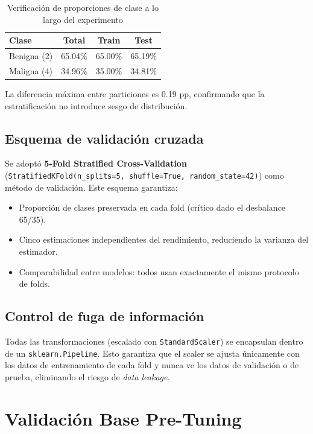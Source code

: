 \documentclass[11pt,a4paper]{article}
\begin{document}
\begin{table}[H]
\centering
\caption{Verificación de proporciones de clase a lo largo del experimento}
\begin{tabular}{lccc}
\toprule
\textbf{Clase} & \textbf{Total} & \textbf{Train} & \textbf{Test} \\
\midrule
Benigna (2) & 65.04\% & 65.00\% & 65.19\% \\
Maligna (4) & 34.96\% & 35.00\% & 34.81\% \\
\bottomrule
\end{tabular}
\end{table}

La diferencia máxima entre particiones es 0.19 pp, confirmando que la estratificación no introduce sesgo de distribución.

\subsection{Esquema de validación cruzada}

Se adoptó \textbf{5-Fold Stratified Cross-Validation} (\texttt{StratifiedKFold(n\_splits=5, shuffle=True, random\_state=42)}) como método de validación. Este esquema garantiza:

\begin{itemize}[leftmargin=1.4cm]
\item Proporción de clases preservada en cada fold (crítico dado el desbalance 65/35).
\item Cinco estimaciones independientes del rendimiento, reduciendo la varianza del estimador.
\item Comparabilidad entre modelos: todos usan exactamente el mismo protocolo de folds.
\end{itemize}

\subsection{Control de fuga de información}

Todas las transformaciones (escalado con \texttt{StandardScaler}) se encapsulan dentro de un \texttt{sklearn.Pipeline}. Esto garantiza que el scaler se ajusta únicamente con los datos de entrenamiento de cada fold y nunca ve los datos de validación o de prueba, eliminando el riesgo de \textit{data leakage}.

\section{Validación Base Pre-Tuning}
\end{document}
